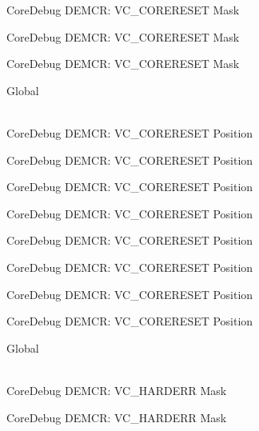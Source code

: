 \begin{DoxyRefList}
\label{deprecated__deprecated000432}%
%
Core\+Debug DEMCR\+: VC\+\_\+\+CORERESET Mask 

\label{deprecated__deprecated000521}%
%
Core\+Debug DEMCR\+: VC\+\_\+\+CORERESET Mask 

\label{deprecated__deprecated000623}%
%
Core\+Debug DEMCR\+: VC\+\_\+\+CORERESET Mask  
\item[{\parbox[t]{\linewidth}{Global \doxylink{group___c_m_s_i_s___core_debug_ga9fcf09666f7063a7303117aa32a85d5a}{Core\+Debug\+\_\+\+DEMCR\+\_\+\+VC\+\_\+\+CORERESET\+\_\+\+Pos} }}]\hfill \\
\label{deprecated__deprecated000069}%
%
Core\+Debug DEMCR\+: VC\+\_\+\+CORERESET Position 

\label{deprecated__deprecated000137}%
%
Core\+Debug DEMCR\+: VC\+\_\+\+CORERESET Position 

\label{deprecated__deprecated000213}%
%
Core\+Debug DEMCR\+: VC\+\_\+\+CORERESET Position 

\label{deprecated__deprecated000276}%
%
Core\+Debug DEMCR\+: VC\+\_\+\+CORERESET Position 

\label{deprecated__deprecated000355}%
%
Core\+Debug DEMCR\+: VC\+\_\+\+CORERESET Position 

\label{deprecated__deprecated000431}%
%
Core\+Debug DEMCR\+: VC\+\_\+\+CORERESET Position 

\label{deprecated__deprecated000520}%
%
Core\+Debug DEMCR\+: VC\+\_\+\+CORERESET Position 

\label{deprecated__deprecated000622}%
%
Core\+Debug DEMCR\+: VC\+\_\+\+CORERESET Position  
\item[{\parbox[t]{\linewidth}{Global \doxylink{group___c_m_s_i_s___core_debug_ga803fc98c5bb85f10f0347b23794847d1}{Core\+Debug\+\_\+\+DEMCR\+\_\+\+VC\+\_\+\+HARDERR\+\_\+\+Msk} }}]\hfill \\
\label{deprecated__deprecated000056}%
%
Core\+Debug DEMCR\+: VC\+\_\+\+HARDERR Mask 

\label{deprecated__deprecated000136}%
%
Core\+Debug DEMCR\+: VC\+\_\+\+HARDERR Mask 


\end{DoxyRefList}
